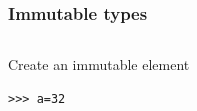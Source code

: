 \documentclass[colorlinks]{beamer}
\begin{document}
{

\begin{frame}[fragile]\frametitle{Immutable types}
\begin{columns}[c]
\begin{block}{Create an immutable element}
\begin{verbatim}
>>> a=32
\end{verbatim}

\end{block}
\end{columns}

\end{frame}
}
\end{document}
